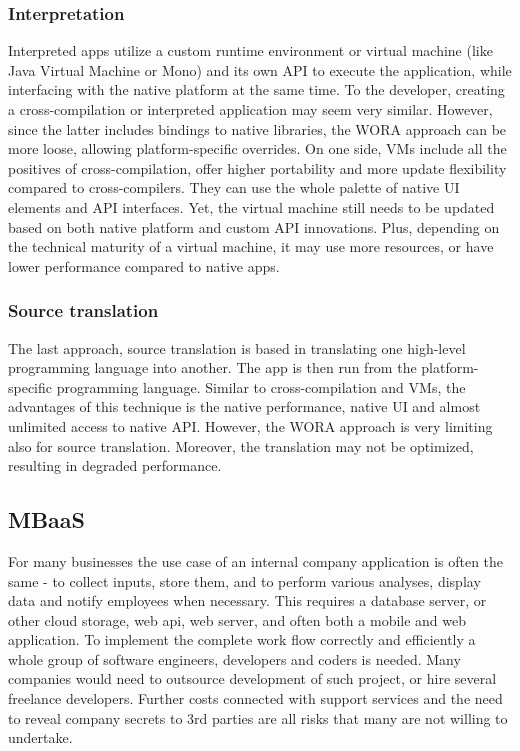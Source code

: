 \documentclass[english,master,public,dept460,male,cpdeclaration,oneside]{diploma}
\begin{document}
\subsubsection{Interpretation}
Interpreted apps utilize a custom runtime environment or virtual machine (like Java Virtual Machine or Mono) and its own API to execute the application, while interfacing with the native platform at the same time. To the developer, creating a cross-compilation or interpreted application may seem very similar. However, since the latter includes bindings to native libraries, the WORA approach can be more loose, allowing platform-specific overrides. On one side, VMs include all the positives of cross-compilation, offer higher portability and more update flexibility compared to cross-compilers. They can use the whole palette of native UI elements and API interfaces. Yet, the virtual machine still needs to be updated based on both native platform and custom API innovations. Plus, depending on the technical maturity of a virtual machine, it may use more resources, or have lower performance compared to native apps.

\subsubsection{Source translation}
The last approach, source translation is based in translating one high-level programming language into another. The app is then run from the platform-specific programming language. Similar to cross-compilation and VMs, the advantages of this technique is the native performance, native UI and almost unlimited access to native API. However, the WORA approach is very limiting also for source translation. Moreover, the translation may not be optimized, resulting in degraded performance. 

\subsection{MBaaS}
For many businesses the use case of an internal company application is often the same - to collect inputs, store them, and to perform various analyses, display data and notify employees when necessary. This requires a database server, or other cloud storage, web api, web server, and often both a mobile and web application. To implement the complete work flow correctly and efficiently a whole group of software engineers, developers and coders is needed. Many companies would need to outsource development of such project, or hire several freelance developers. Further costs connected with support services and the need to reveal company secrets to 3rd parties are all risks that many are not willing to undertake.
\end{document}
